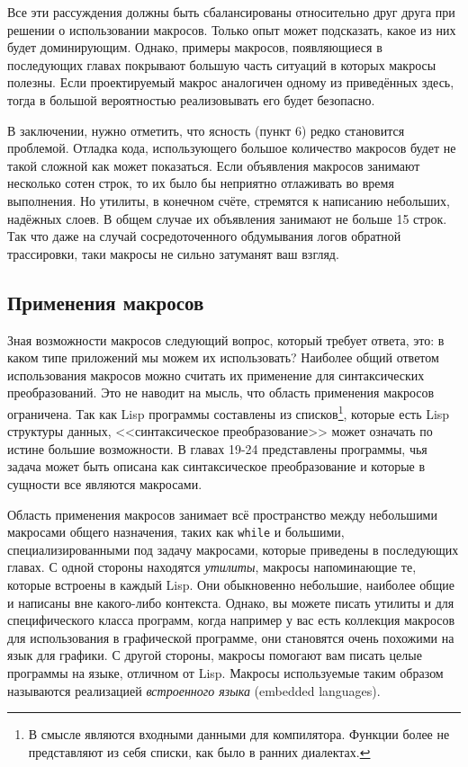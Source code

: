 \documentclass[12pt, a4paper]{article} %
\begin{document}
Все эти рассуждения должны быть сбалансированы относительно друг друга при решении о использовании макросов. Только опыт может подсказать, какое из них будет доминирующим. Однако, примеры макросов, появляющиеся в последующих главах покрывают большую часть ситуаций в которых макросы полезны. Если проектируемый макрос аналогичен одному из приведённых здесь, тогда в большой вероятностью реализовывать его будет безопасно.

В заключении, нужно отметить, что ясность (пункт 6) редко становится проблемой. Отладка кода, использующего большое количество макросов будет не такой сложной как может показаться. Если объявления макросов занимают несколько сотен строк, то их было бы неприятно отлаживать во время выполнения. Но утилиты, в конечном счёте, стремятся к написанию небольших, надёжных слоев. В общем случае их объявления занимают не больше 15 строк. Так что даже на случай сосредоточенного обдумывания логов обратной трассировки, таки макросы не сильно затуманят ваш взгляд.


\subsection{Применения макросов}

Зная возможности макросов следующий вопрос, который требует ответа, это: в каком типе приложений мы можем их использовать? Наиболее общий ответом использования макросов можно считать их применение для синтаксических преобразований. Это не наводит на мысль, что область применения макросов ограничена. Так как Lisp программы составлены из списков\footnote{В смысле являются входными данными для компилятора. Функции более не представляют из себя списки, как было в ранних диалектах. }, которые есть Lisp структуры данных, <<синтаксическое преобразование>> может означать по истине большие возможности. В главах 19-24 представлены программы, чья задача может быть описана как синтаксическое преобразование и которые в сущности все являются макросами.

Область применения макросов занимает всё пространство между небольшими макросами общего назначения, таких как \texttt{while} и большими, специализированными под задачу макросами, которые приведены в последующих главах. С одной стороны находятся \textit{утилиты}, макросы напоминающие те, которые встроены в каждый Lisp. Они обыкновенно небольшие, наиболее общие и написаны вне какого-либо контекста. Однако, вы можете писать утилиты и для специфического класса программ, когда например у вас есть коллекция макросов для использования в графической программе, они становятся очень похожими на язык для графики. С другой стороны, макросы помогают вам писать целые программы на языке, отличном от Lisp. Макросы используемые таким образом называются реализацией \textit{встроенного языка} (embedded languages).
\end{document}
